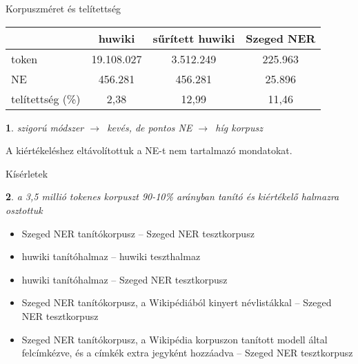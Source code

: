 \documentclass[utf8x,t]{beamer}
\newcommand{\nyil}{$\rightarrow$\ }
\newtheorem{nix}{}[section]
\begin{document}
\begin{frame}{Korpuszméret és telítettség}

\bigskip

\begin{tabular}{lccc}
\toprule
 & \textbf{huwiki} & \textbf{sűrített huwiki} & \textbf{Szeged NER} \\
\midrule
token & 19.108.027 & 3.512.249  & 225.963 \\
NE & 456.281 & 456.281  & 25.896 \\
telítettség (\%) & 2,38 & 12,99 & 11,46 \\
\bottomrule
\end{tabular}

\bigskip

\begin{nix}
szigorú módszer \nyil kevés, de pontos NE \nyil híg korpusz
\end{nix}

\bigskip

A kiértékeléshez eltávolítottuk a NE-t nem tartalmazó mondatokat.

\end{frame}

\begin{frame}{Kísérletek}

\begin{nix}
a 3,5 millió tokenes korpuszt 90-10\% arányban tanító és kiértékelő halmazra osztottuk
\end{nix}

\bigskip

\begin{itemize}
\item Szeged NER tanítókorpusz -- Szeged NER tesztkorpusz
\item huwiki tanítóhalmaz -- huwiki teszthalmaz
\item huwiki tanítóhalmaz -- Szeged NER tesztkorpusz
\item Szeged NER tanítókorpusz, a Wikipédiából kinyert névlistákkal -- Szeged NER tesztkorpusz %
\item Szeged NER tanítókorpusz, a Wikipédia korpuszon tanított modell által felcímkézve, és a címkék extra jegyként hozzáadva -- Szeged NER tesztkorpusz
\end{itemize}

\end{frame}
\end{document}
